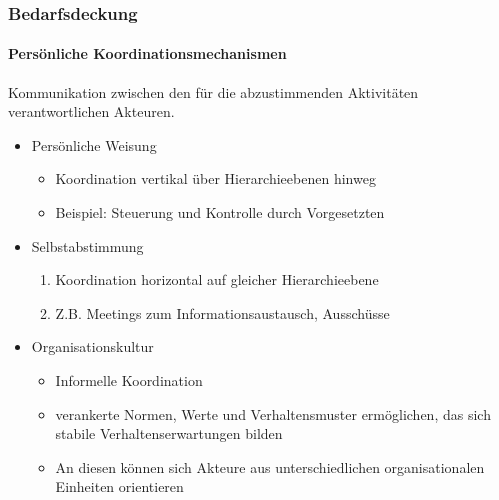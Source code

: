 \subsubsection{Bedarfsdeckung}
\paragraph{Persönliche Koordinationsmechanismen}
Kommunikation zwischen den für die abzustimmenden Aktivitäten verantwortlichen Akteuren.
\begin{itemize}
	\item Persönliche Weisung
	\begin{itemize}
		\item Koordination vertikal über Hierarchieebenen hinweg
		\item Beispiel: Steuerung und Kontrolle durch Vorgesetzten
	\end{itemize}
	\item Selbstabstimmung
	\begin{enumerate}
		\item Koordination horizontal auf gleicher Hierarchieebene
		\item Z.B. Meetings zum Informationsaustausch, Ausschüsse
	\end{enumerate}
	\item Organisationskultur
	\begin{itemize}
		\item Informelle Koordination
		\item verankerte Normen, Werte und Verhaltensmuster ermöglichen, das sich stabile Verhaltenserwartungen bilden
		\item An diesen können sich Akteure aus unterschiedlichen organisationalen Einheiten orientieren
	\end{itemize}
\end{itemize}

